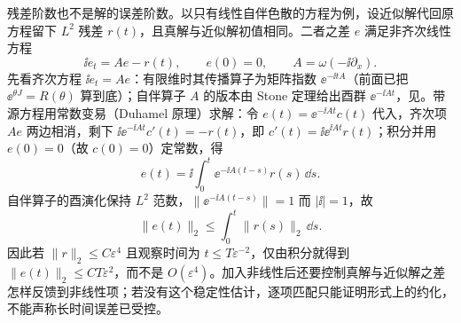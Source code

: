 残差阶数也不是解的误差阶数。以只有线性自伴色散的方程为例，设近似解代回原方程留下 \(L^2\) 残差 \(r(t)\)，且真解与近似解初值相同。二者之差 \(e\) 满足非齐次线性方程
\[
\ii e_t=Ae-r(t),\qquad e(0)=0,\qquad A=\omega(-\ii\partial_x).
\]
先看齐次方程 \(\ii e_t=Ae\)：有限维时其传播算子为矩阵指数 \(\ee^{-\ii tA}\)（前面已把 \(\ee^{\theta J}=R(\theta)\) 算到底）；自伴算子 \(A\) 的版本由 Stone 定理给出酉群 \(\ee^{-\ii At}\)，见。带源方程用常数变易（Duhamel 原理）求解：令 \(e(t)=\ee^{-\ii At}c(t)\) 代入，齐次项 \(Ae\) 两边相消，剩下 \(\ii \ee^{-\ii At}c'(t)=-r(t)\)，即 \(c'(t)=\ii \ee^{\ii At}r(t)\)；积分并用 \(e(0)=0\)（故 \(c(0)=0\)）定常数，得
\[
e(t)=\ii\int_0^t \ee^{-\ii A(t-s)}r(s)\,\dd s.
\]
自伴算子的酉演化保持 \(L^2\) 范数，\(\|\ee^{-\ii A(t-s)}\|=1\) 而 \(|\ii|=1\)，故
\[
\|e(t)\|_2\le\int_0^t\|r(s)\|_2\,\dd s.
\]
因此若 \(\|r\|_2\le C\varepsilon^4\) 且观察时间为 \(t\le T\varepsilon^{-2}\)，仅由积分就得到 \(\|e(t)\|_2\le CT\varepsilon^2\)，而不是 \(O(\varepsilon^4)\)。加入非线性后还要控制真解与近似解之差怎样反馈到非线性项；若没有这个稳定性估计，逐项匹配只能证明形式上的约化，不能声称长时间误差已受控。

